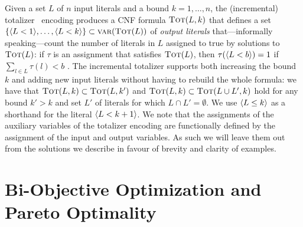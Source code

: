 Given a set $L$ of $n$ input literals and a bound $k=1, \ldots, n$, the (incremental) totalizer~\autocite{DBLP:conf/cp/BailleuxB03,DBLP:conf/cp/MartinsJML14} encoding produces a CNF formula $\textsc{Tot}(L, k)$ that defines a set $\{\langle L < 1 \rangle, \ldots, \langle L < k \rangle\} \subset \textsc{var}(\textsc{Tot}(L))$ of \emph{output literals} that---informally speaking---count the number of literals in $L$ assigned to true by solutions to $\textsc{Tot}(L)$:
if $\tau$ is an assignment that satisfies $\textsc{Tot}(L)$, then $\tau(\langle L < b \rangle) = 1$ if $\sum_{l \in L} \tau(l) < b$ .
The incremental totalizer supports both increasing the bound $k$ and adding new input literals without having to rebuild the whole formula:
we have that $\textsc{Tot}(L, k) \subset \textsc{Tot}(L, k')$ and $\textsc{Tot}(L, k) \subset  \textsc{Tot}(L \cup L', k)$ hold for any bound $k' > k$ and set $L'$ of literals for which $L \cap L' =  \emptyset$. 
We use $\langle L \leq k \rangle$ as a shorthand for the literal $\langle L < k+1 \rangle$.
We note that the assignments of the auxiliary variables of the totalizer encoding are functionally defined by the assignment of the input and output variables.
As such we will leave them out from the solutions we describe in favour of brevity and clarity of examples. 

\section{Bi-Objective Optimization and Pareto Optimality\label{sec:biopt}}


